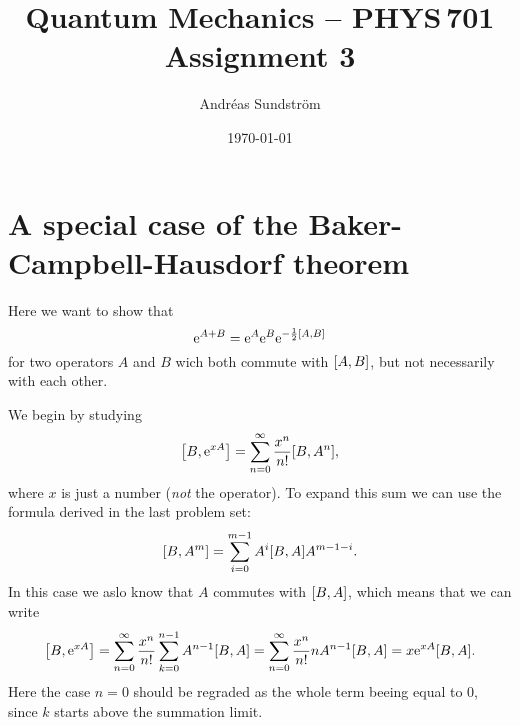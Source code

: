 \documentclass[11pt,letter, swedish, english
]{article}
\begin{document}
\title{Quantum Mechanics -- PHYS\,701 \\
Assignment 3}
\author{Andréas Sundström}
\date{\today}

\maketitle



\section{A special case of the Baker-Campbell-Hausdorf theorem}
Here we want to show that
\begin{equation}\label{eq:1_want_this}
\ee^{A+B} = \ee^A\ee^B\ee^{-\frac{1}{2}\comm{A}{B}}
\end{equation}
for two operators $A$ and $B$ wich both commute with $\comm{A}{B}$,
but not necessarily with each other.

We begin by studying
\begin{equation}
\comm{B}{\ee^{x A}}=\sum_{n=0}^\infty \frac{x^n}{n!}\comm{B}{A^n},
\end{equation}
where $x$ is just a number (\emph{not} the operator). To expand this
sum we can use the formula derived in the last problem
set\footnotemark{}:
\begin{equation}
\comm{B}{A^{m}} =\sum_{i=0}^{m-1} A^{i}\comm{B}{A}A^{m-1-i}.
\end{equation}
In this case we aslo know that $A$ commutes with $\comm{B}{A}$, which
means that we can write
\begin{equation}\label{eq:1_comm}
\comm{B}{\ee^{x A}}=\sum_{n=0}^\infty \frac{x^n}{n!}
\sum_{k=0}^{n-1}A^{n-1}\comm{B}{A}
=\sum_{n=0}^\infty \frac{x^n}{n!}
nA^{n-1}\comm{B}{A}
=x\ee^{xA}\comm{B}{A}.
\end{equation}
Here the case $n=0$ should be regraded as the whole term beeing equal
to $0$, since $k$ starts above the summation limit.
\end{document}
